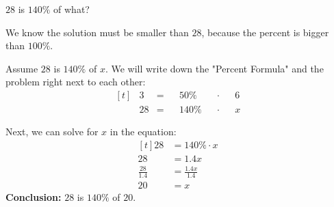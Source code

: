 \begin{myexample}
$28$ is $140\%$ of what?
\end{myexample}
\begin{solution}
We know the solution must be smaller than $28$, because the percent is bigger than $100\%$.

Assume $28$ is $140\%$ of $x$. We will write down the "Percent Formula" and the problem right next to each other:
\[
\begin{aligned}[t]
	&3 &= &&50\% &&\cdot &&6 \\
	&28 &= &&140\% &&\cdot &&x
\end{aligned}
\]

Next, we can solve for $x$ in the equation:
\[
\begin{aligned}[t]
	28 &= 140\% \cdot x \\
	28 &= 1.4x \\
	\frac{28}{1.4} &= \frac{1.4x}{1.4} \\
	20 &= x
\end{aligned}
\]
\textbf{Conclusion:} $28$ is $140\%$ of $20$.

\end{solution}
